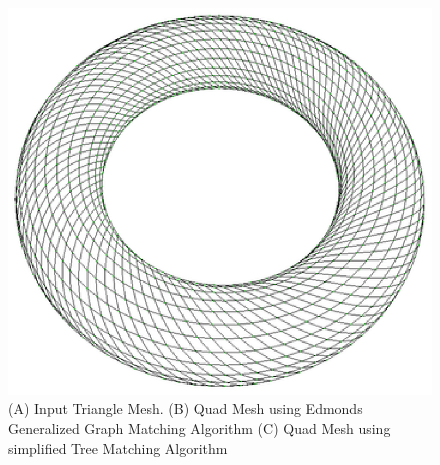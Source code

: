 \documentclass[11pt, a4paper]{paper}
\begin{document}
\begin{figure}
\includegraphics[scale=0.33]{torus3.eps}
\caption { (A) Input Triangle Mesh. (B) Quad Mesh using Edmonds Generalized
Graph Matching Algorithm (C) Quad Mesh using simplified Tree Matching Algorithm }
\end{figure}
\end{document}
